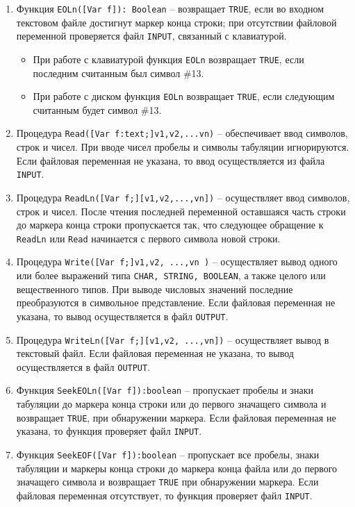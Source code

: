 \begin{enumerate}
\item Функция \texttt{EOLn([Var  f]): Boolean} – возвращает \texttt{TRUE}, если во входном текстовом файле достигнут маркер конца строки; при отсутствии файловой переменной проверяется файл \texttt{INPUT}, связанный с клавиатурой.

\begin{itemize}
\item При работе с клавиатурой функция \texttt{EOLn} возвращает \texttt{TRUE}, если последним считанным был символ \#13. 
\item При работе с диском функция \texttt{EOLn} возвращает \texttt{TRUE}, если следующим считанным будет символ \#13.
\end{itemize}

\item Процедура \texttt{Read([Var f:text;]v1,v2,...vn)} – обеспечивает ввод символов, строк и чисел. При вводе чисел пробелы и символы табуляции игнорируются. Если файловая переменная не указана, то ввод осуществляется из файла \texttt{INPUT}.

\item Процедура \texttt{ReadLn([Var f;][v1,v2,...,vn])} – осуществляет ввод символов, строк и чисел. После чтения последней переменной оставшаяся часть строки до маркера конца строки пропускается так, что следующее обращение к \texttt{ReadLn} или \texttt{Read} начинается с первого символа новой строки. 

\item Процедура \texttt{Write([Var  f;]v1,v2, ...,vn )} – осуществляет вывод одного или более выражений типа \texttt{CHAR, STRING, BOOLEAN}, а также целого или вещественного типов. При выводе числовых значений последние преобразуются в символьное представление. Если файловая переменная не указана, то вывод осуществляется в файл \texttt{OUTPUT}.
    
\item Процедура \texttt{WriteLn([Var f;][v1,v2, ...,vn])} – осуществляет вывод в текстовый файл. Если файловая переменная не указана, то вывод осуществляется в файл \texttt{OUTPUT}.
     
\item Функция \texttt{SeekEOLn([Var f]):boolean} – пропускает пробелы и знаки табуляции до маркера конца строки или до первого значащего символа и возвращает \texttt{TRUE}, при обнаружении маркера. Если файловая переменная не указана, то функция проверяет файл \texttt{INPUT}.

\item Функция \texttt{SeekEOF([Var f]):boolean} – пропускает все пробелы, знаки табуляции и маркеры конца строки до маркера конца файла или до первого значащего символа и возвращает \texttt{TRUE} при обнаружении маркера. Если файловая переменная отсутствует, то функция проверяет файл \texttt{INPUT}.
\end{enumerate}

